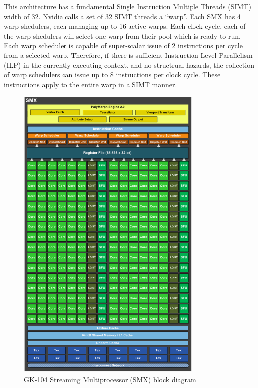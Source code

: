 \documentclass[11pt, oneside, a4paper]{article}
\begin{document}
This architecture has a fundamental Single Instruction Multiple Threads (SIMT) width of 32. Nvidia calls a set of 32 SIMT threads a ``warp''.
Each SMX has 4 warp shedulers, each managing up to 16 active warps. Each clock cycle, each of the warp shedulers will select one warp from their pool which is ready to run.
Each warp scheduler is capable of super-scalar issue of 2 instructions per cycle from a selected warp.
Therefore, if there is sufficient Instruction Level Parallelism (ILP) in the currently executing context, and no structrual hazards, the collection of warp schedulers can issue up to 8 instructions per clock cycle.
These instructions apply to the entire warp in a SIMT manner.

\begin{figure}[tb]
	\begin{center}
		\includegraphics[width=0.8\textwidth]{SMX}
	\end{center}
	\caption{GK-104 Streaming Multiprocessor (SMX) block diagram}
	\label{fig:SMX}
\end{figure}
\end{document}
